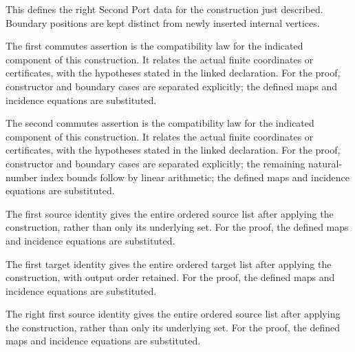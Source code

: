 This defines the right Second Port data for the construction just described. Boundary positions are kept distinct from newly inserted internal vertices.
\par{}

The first commutes assertion is the compatibility law for the indicated component of this construction. It relates the actual finite coordinates or certificates, with the hypotheses stated in the linked declaration.
For the proof, constructor and boundary cases are separated explicitly; the defined maps and incidence equations are substituted.
\par{}

The second commutes assertion is the compatibility law for the indicated component of this construction. It relates the actual finite coordinates or certificates, with the hypotheses stated in the linked declaration.
For the proof, constructor and boundary cases are separated explicitly; the remaining natural-number index bounds follow by linear arithmetic; the defined maps and incidence equations are substituted.
\par{}

The first source identity gives the entire ordered source list after applying the construction, rather than only its underlying set.
For the proof, the defined maps and incidence equations are substituted.
\par{}

The first target identity gives the entire ordered target list after applying the construction, with output order retained.
For the proof, the defined maps and incidence equations are substituted.
\par{}

The right first source identity gives the entire ordered source list after applying the construction, rather than only its underlying set.
For the proof, the defined maps and incidence equations are substituted.
\par{}

